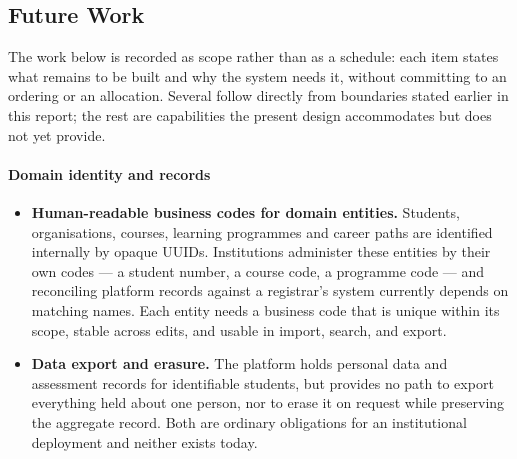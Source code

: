 \subsection{Future Work}
\label{sec:conclusion_future_work}

The work below is recorded as scope rather than as a schedule: each item states what remains to be built and why the system needs it, without committing to an ordering or an allocation. Several follow directly from boundaries stated earlier in this report; the rest are capabilities the present design accommodates but does not yet provide.

\paragraph{Domain identity and records}
\begin{itemize}
    \item \textbf{Human-readable business codes for domain entities.} Students, organisations, courses, learning programmes and career paths are identified internally by opaque UUIDs. Institutions administer these entities by their own codes --- a student number, a course code, a programme code --- and reconciling platform records against a registrar's system currently depends on matching names. Each entity needs a business code that is unique within its scope, stable across edits, and usable in import, search, and export.

    \item \textbf{Data export and erasure.} The platform holds personal data and assessment records for identifiable students, but provides no path to export everything held about one person, nor to erase it on request while preserving the aggregate record. Both are ordinary obligations for an institutional deployment and neither exists today.
\end{itemize}

